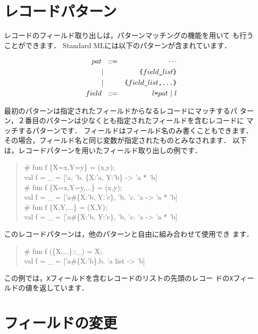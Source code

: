 \documentclass{jbook}
\begin{document}
\section{レコードパターン}
\label{sec:extensionRecordpattern}

	レコードのフィールド取り出しは，パターンマッチングの機能を用いて
も行うことができます．
	Standard MLには以下のパターンが含まれています．
\begin{tt}
\begin{eqnarray*}
pat &\mbox{\ \ }::=& \cdots \\
     &|& \mbox{\tt \{$field\_list$\}}
\\
     &|& \mbox{\tt \{$field\_list$,...\}}
\\
field &\mbox{\ \ }::=& \mbox{\tt $l$=$pat$} \ | \ l
\end{eqnarray*}
\end{tt}
	最初のパターンは指定されたフィールドからなるレコードにマッチするパ
ターン，２番目のパターンは少なくとも指定されたフィールドを含むレコードに
マッチするパターンです．
	フィールドはフィールド名のみ書くこともできます．
	その場合，フィールド名と同じ変数が指定されたものとみなされます．
	以下は，レコードパターンを用いたフィールド取り出しの例です．
\begin{tt}\begin{quote}
\# fun f \{X=x,Y=y\} = (x,y);\\
val f = \_ = ['a, 'b. \{X:'a, Y:'b\} -> 'a * 'b]\\
\# fun f \{X=x,Y=y,...\} = (x,y);\\
val f = \_ = ['a\#\{X:'b, Y:'c\}, 'b, 'c. 'a -> 'a * 'b]\\
\# fun f \{X,Y,...\} = (X,Y);\\
val f = \_ = ['a\#\{X:'b, Y:'c\}, 'b, 'c. 'a -> 'a * 'b]
\end{quote}\end{tt}
	このレコードパターンは，他のパターンと自由に組み合わせて使用でき
ます．
\begin{tt}\begin{quote}
\# fun f (\{X,...\}::\_) = X;\\
val f = \_ = ['a\#\{X:'b\},b. 'a list -> 'b]\\
\end{quote}\end{tt}
	この例では，{\tt X}フィールドを含むレコードのリストの先頭のレコー
ドの{\tt X}フィールドの値を返しています．

\section{フィールドの変更}
\label{sec:extensionFieldupdate}
\end{document}
